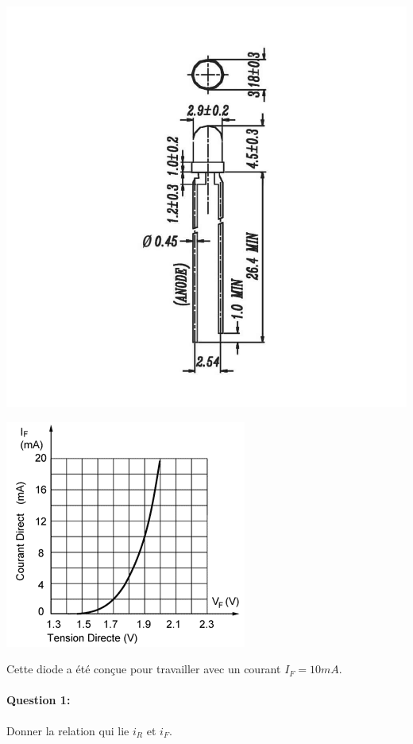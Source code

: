 \begin{minipage}{0.49\linewidth}
\begin{center}
\includegraphics[width=0.7\linewidth]{img/DEL_data}
\end{center}
\end{minipage}
\hfill
\begin{minipage}{0.49\linewidth}
\begin{center}
\includegraphics[width=0.7\linewidth]{img/DEL_carac}
\end{center}
\end{minipage}

Cette diode a été conçue pour travailler avec un courant $I_F=10mA$.

\paragraph{Question 1:} Donner la relation qui lie $i_R$ et $i_F$.


